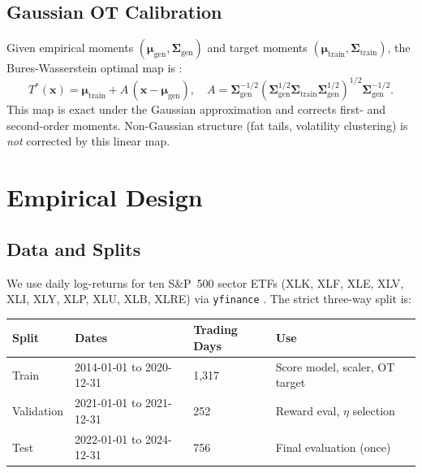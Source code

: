 \documentclass{article}
\newcommand{\bSigma}{\boldsymbol{\Sigma}}
\newcommand{\bmu}{\boldsymbol{\mu}}
\newcommand{\bx}{\mathbf{x}}
\begin{document}
\subsection{Gaussian OT Calibration}

Given empirical moments $(\bmu_\text{gen}, \bSigma_\text{gen})$ and target
moments $(\bmu_\text{train}, \bSigma_\text{train})$, the Bures-Wasserstein
optimal map is \citep{bhatia2019bures}:
\begin{equation}
  T^*(\bx)
  = \bmu_\text{train} + A\,(\bx - \bmu_\text{gen}),\quad
  A = \bSigma_\text{gen}^{-1/2}
      \!\left(\bSigma_\text{gen}^{1/2}\bSigma_\text{train}\bSigma_\text{gen}^{1/2}\right)^{\!1/2}
      \bSigma_\text{gen}^{-1/2}.
  \label{eq:gauss-ot}
\end{equation}
This map is exact under the Gaussian approximation and corrects first- and
second-order moments. Non-Gaussian structure (fat tails, volatility clustering)
is \emph{not} corrected by this linear map.

\section{Empirical Design}
\label{sec:design}

\subsection{Data and Splits}

We use daily log-returns for ten S\&P~500 sector ETFs
(XLK, XLF, XLE, XLV, XLI, XLY, XLP, XLU, XLB, XLRE) via \texttt{yfinance}
\citep{ranaraja2019yfinance}. The strict three-way split is:

\begin{center}
\begin{tabular}{llll}
\toprule
\textbf{Split} & \textbf{Dates} & \textbf{Trading Days} & \textbf{Use} \\
\midrule
Train      & 2014-01-01 to 2020-12-31 & 1,317 & Score model, scaler, OT target \\
Validation & 2021-01-01 to 2021-12-31 &   252 & Reward eval, $\eta$ selection \\
Test       & 2022-01-01 to 2024-12-31 &   756 & Final evaluation (once) \\
\bottomrule
\end{tabular}
\end{center}
\end{document}
